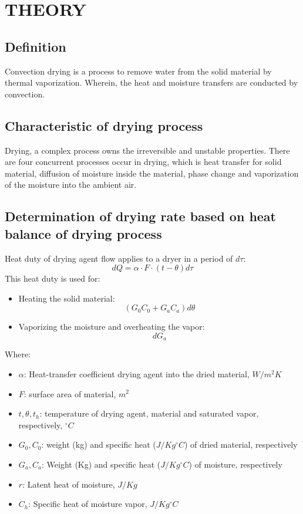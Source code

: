 \section{THEORY}
\subsection{Definition}
Convection drying is a process to remove water from the solid material by thermal vaporization. Wherein, the heat and moisture transfers are conducted by convection.

\subsection{Characteristic of drying process}
Drying, a complex process owns the irreversible and unstable properties. There are four concurrent processes occur in drying, which is heat transfer for solid material, diffusion of moisture inside the material, phase change and vaporization of the moisture into the ambient air.

\subsection{Determination of drying rate based on heat balance of drying process}
Heat duty of drying agent flow applies to a dryer in a period of $d\tau$:
\begin{equation}
    dQ = \alpha \cdot F \cdot (t - \theta) d\tau
\end{equation}
This heat duty is used for:
\begin{itemize}
    \item Heating the solid material:
          \begin{equation}
              (G_0C_0 + G_aC_a) d\theta
          \end{equation}
    \item Vaporizing the moisture and overheating the vapor:
          \begin{equation}
              [r + C_h(t - t_h)] dG_a
          \end{equation}
\end{itemize}
Where:
\begin{itemize}
    \item $\alpha$: Heat-transfer coefficient drying agent into the dried material, $W/m^2K$
    \item $F$: surface area of material, $m^2$
    \item $t, \theta, t_h$: temperature of drying agent, material and saturated vapor, respectively, $^\circ C$
    \item $G_0, C_0$: weight (kg) and specific heat ($J/Kg^\circ C$) of dried material, respectively
    \item $G_a, C_a$: Weight (Kg) and specific heat ($J/Kg^\circ C$) of moisture, respectively
    \item $r$: Latent heat of moisture, $J/Kg$
    \item $C_h$: Specific heat of moisture vapor, $J/Kg^\circ C$
\end{itemize}

